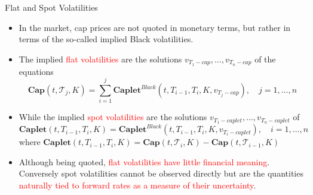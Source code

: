 \documentclass{beamer}
\begin{document}
\begin{frame}{Flat and Spot Volatilities}
	\begin{itemize}
		\item<1-> In the market, cap prices are not quoted in monetary terms, but rather in terms of the so-called implied Black volatilities. 
		\item<2-> The implied \textcolor{red}{flat volatilities} are the solutions $v_{T_1-cap},\ldots, v_{T_n-cap}$ of the equations
		\begin{equation*}
			\textbf{Cap}(t, \mathcal{T}_j, K) = \sum_{i=1}^j \textbf{Caplet}^{Black}(t, T_{i-1}, T_i,K,v_{T_j-cap}),\quad j=1, \ldots,n
		\end{equation*}
		\item<3-> While the implied \textcolor{red}{spot volatilities} are the solutions $v_{T_1-caplet},\ldots, v_{T_n-caplet}$ of
		\begin{equation*}
			\textbf{Caplet}(t, T_{i-1},T_i,K) = \textbf{Caplet}^{Black}(t, T_{i-1}, T_i,K,v_{T_i-caplet}),\quad i=1, \ldots,n
		\end{equation*} 
		where $\textbf{Caplet}(t, T_{i-1}, T_i, K) = \textbf{Cap}(t, \mathcal{T}_i,K)-\textbf{Cap}(t, \mathcal{T}_{i-1},K)$
		\item<4-> Although being quoted, \textcolor{red}{flat volatilities have little financial meaning}. Conversely spot volatilities cannot be observed directly but are the quantities \textcolor{red}{naturally tied to forward rates as a measure of their uncertainty}.
		\end{itemize}
\end{frame}
\end{document}
